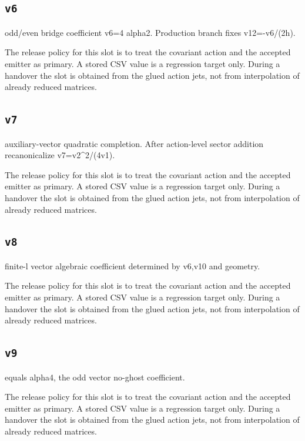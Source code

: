 \documentclass[11pt,a4paper,oneside]{book}
\begin{document}
\subsection{\texttt{v6}}
odd/even bridge coefficient v6=4 alpha2. Production branch fixes v12=-v6/(2h).

The release policy for this slot is to treat the covariant action and the accepted emitter as primary. A stored CSV value is a regression target only. During a handover the slot is obtained from the glued action jets, not from interpolation of already reduced matrices.\par

\subsection{\texttt{v7}}
auxiliary-vector quadratic completion. After action-level sector addition recanonicalize v7=v2\textasciicircum{}2/(4v1).

The release policy for this slot is to treat the covariant action and the accepted emitter as primary. A stored CSV value is a regression target only. During a handover the slot is obtained from the glued action jets, not from interpolation of already reduced matrices.\par

\subsection{\texttt{v8}}
finite-l vector algebraic coefficient determined by v6,v10 and geometry.

The release policy for this slot is to treat the covariant action and the accepted emitter as primary. A stored CSV value is a regression target only. During a handover the slot is obtained from the glued action jets, not from interpolation of already reduced matrices.\par

\subsection{\texttt{v9}}
equals alpha4, the odd vector no-ghost coefficient.

The release policy for this slot is to treat the covariant action and the accepted emitter as primary. A stored CSV value is a regression target only. During a handover the slot is obtained from the glued action jets, not from interpolation of already reduced matrices.\par
\end{document}
